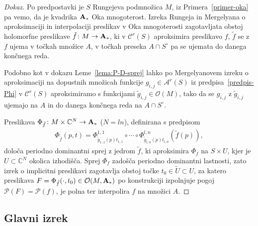 \documentclass[12pt,a4paper,twoside]{article}
\theoremstyle{definition} %
\newenvironment{dokaz}[1][Dokaz]{\begin{proof}[#1]}{\end{proof}}
\theoremstyle{plain} %
\numberwithin{equation}{section}  %
\begin{document}
\begin{dokaz}
Po predpostavki je $S$ Rungejeva podmnožica $M$, iz Primera~\ref{primer-oka} pa vemo, da je kvadrika $\textbf{\textup{A}}_{*}$ Oka mnogoterost.
Izreka Rungeja in Mergelyana o aproksimaciji in interpolaciji preslikav v Oka mnogoterosti zagotavljata obstoj holomorfne preslikave $\tilde{f} \colon M \to \textbf{\textup{A}}_{*}$, ki v $\mathcal{C}^{r}(S)$ aproksimira preslikavo $f$, $\tilde{f}$ se z $f$ ujema v točkah množice $A$, v točkah preseka $A \cap S^{\circ}$ pa se ujemata do danega končnega reda.

Podobno kot v dokazu Leme~\ref{lema:P-D-sprej} lahko po Mergelyanovem izreku o aproksimaciji na dopustnih množicah funkcije $g_{i,j} \in \mathcal{A}^{r}(S)$ iz predpisa~\eqref{predpis-Phi} v $\mathcal{C}^{r}(S)$ aproksimiramo s funkcijami $\tilde{g}_{i,j} \in \mathcal{O}(M)$, tako da se $g_{i,j}$ z $\tilde{g}_{i,j}$ ujemajo na $A$ in do danega končnega reda na $A \cap S^{\circ}$.

Preslikava $\Phi_{\tilde{f}} \colon M \times \mathbb{C}^{N} \to \textbf{\textup{A}}_{*}$ ($N=ln$), definirana s predpisom
\begin{gather}
\Phi_{\tilde{f}}(p,t) = \Phi_{\tilde{g}_{1,1}(p)t_{1,1}}^{1,1} \circ \cdots \circ \Phi_{\tilde{g}_{l,n}(p)t_{l,n}}^{l,n} (\tilde{f}(p)),
\end{gather}
določa periodno dominantni sprej z jedrom $\tilde{f}$, ki aproksimira $\Phi_{f}$ na $S \times U$, kjer je $U \subset \mathbb{C}^{N}$ okolica izhodišča.
Sprej $\Phi_{f}$ zadošča periodno dominantni lastnosti, zato izrek o implicitni preslikavi zagotavlja obstoj točke $t_0 \in \tilde{U} \subset U$, za katero preslikava $F = \Phi_{\tilde{f}}(\cdot, t_0) \in \mathcal{O}(M, \textbf{\textup{A}}_{*})$ po konstrukciji izpolnjuje pogoj $\mathcal{P}(F) = \mathcal{P}(f)$, je polna ter interpolira $f$ na množici $A$.
\end{dokaz}

\subsection{Glavni izrek}

\end{document}
